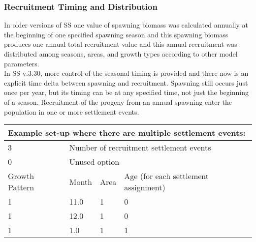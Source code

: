 \subsubsection{Recruitment Timing and Distribution}
In older versions of SS one value of spawning biomass was calculated annually at the beginning of one specified spawning season and this spawning biomass produces one annual total recruitment value and this annual recruitment was distributed among seasons, areas, and growth types according to other model parameters.\\ 

In SS v.3.30, more control of the seasonal timing is provided and there now is an explicit time delta between spawning and recruitment. Spawning still occurs just once per year, but its timing can be at any specified time, not just the beginning of a season.  Recruitment of the progeny from an annual spawning enter the population in one or more settlement events.  

\begin{center}
	\begin{tabular}{p{3cm} p{2cm} p{2cm} p{7cm}}
		\multicolumn{4}{l}{Example set-up where there are multiple settlement events:}\\
		\hline
		3 & \multicolumn{3}{l}{Number of recruitment settlement events}\Tstrut\\
		0 & \multicolumn{3}{l}{Unused option}\Bstrut\\
		\hline
		Growth Pattern & Month & Area & Age (for each settlement assignment)\Tstrut\Bstrut\\
		\hline
		1 & 11.0 & 1 & 0 \Tstrut\\
		1 & 12.0 & 1 & 0 \\
		1 & 1.0  & 1 & 1 \Bstrut\\
		\hline
	\end{tabular}		
\end{center}

